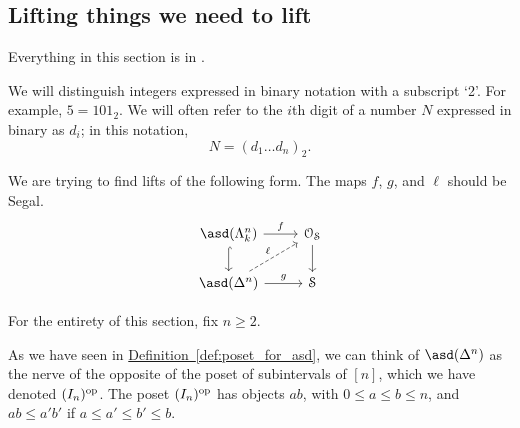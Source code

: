 \documentclass[main.tex]{subfiles}
\begin{document}
\subsection{Lifting things we need to lift}
\label{ssc:lifting_things_we_need_to_lift}

Everything in this section is in \cite{spectralmackeyfunctors1}.

\begin{notation}
  We will distinguish integers expressed in binary notation with a subscript `2'. For example, $5 = 101_{2}$. We will often refer to the $i$th digit of a number $N$ expressed in binary as $d_{i}$; in this notation,
  \begin{equation*}
    N = (d_{1}\ldots d_{n})_{2}.
  \end{equation*}
\end{notation}

We are trying to find lifts of the following form. The maps $f$, $g$, and $\ell$ should be Segal.
\begin{equation*}
  \begin{tikzcd}
    \asd(\Lambda^{n}_{k})
    \arrow[r, "f"]
    \arrow[d, hook]
    & \OS
    \arrow[d]
    \\
    \asd(\Delta^{n})
    \arrow[r, "g"]
    \arrow[ur, dashed, "\ell"]
    & \S
  \end{tikzcd}
\end{equation*}

For the entirety of this section, fix $n \geq 2$.

As we have seen in \hyperref[def:poset_for_asd]{Definition~\ref*{def:poset_for_asd}}, we can think of $\asd(\Delta^{n})$ as the nerve of the opposite of the poset of subintervals of $[n]$, which we have denoted $(I_{n})^{\mathrm{op}}$. The poset $(I_{n})^{\mathrm{op}}$ has objects $ab$, with $0 \leq a \leq b \leq n$, and $ab \leq a'b'$ if $a \leq a' \leq b' \leq b$.
\end{document}

